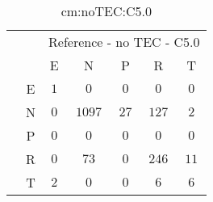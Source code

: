 \begin{table}[!ht]
	\centering
	\begin{tabular}{|c|c|c|c|c|c|c|}
		\cline{3-7}
		\multicolumn{2}{c|}{} & \multicolumn{5}{|c|}{Reference - no TEC - C5.0} \\ \cline{3-7}
		\multicolumn{2}{c|}{} & E & N & P & R & T \\ \hline
		\multirow{5}{*}{\rotatebox{90}{Prediction}} & E & $1$ & $0$ & $0$ & $0$ & $0$ \\ \cline{2-7}
		 & N & $0$ & $1097$ & $27$ & $127$ & $2$ \\ \cline{2-7}
		 & P & $0$ & $0$ & $0$ & $0$ & $0$ \\ \cline{2-7}
		 & R & $0$ & $73$ & $0$ & $246$ & $11$ \\ \cline{2-7}
		 & T & $2$ & $0$ & $0$ & $6$ & $6$ \\ \hline
	\end{tabular}
	\caption{cm:noTEC:C5.0}
	\label{tab:cm:noTEC:C5.0}
\end{table}
